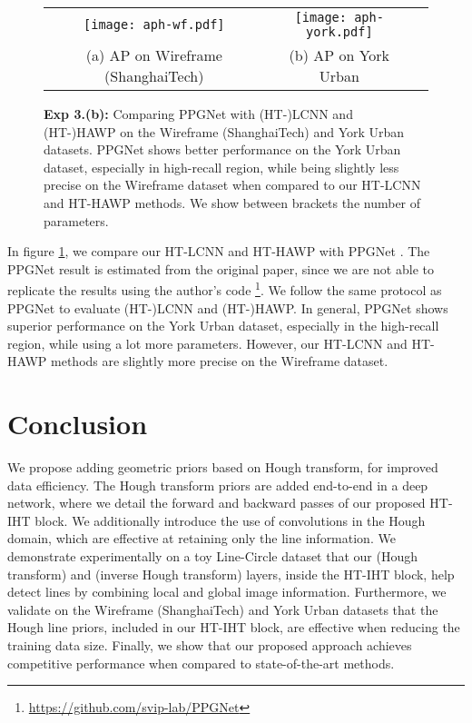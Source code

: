 \documentclass[runningheads]{llncs}
\newcommand{\model}{HT-IHT block\xspace}
\begin{document}
\begin{figure}[t!]
    \centering
    \begin{tabular}{ccc}
        \texttt{[image: aph-wf.pdf]} &
        \texttt{[image: aph-york.pdf]} \\
        \scriptsize{(a) AP on Wireframe (ShanghaiTech)} & 
        \scriptsize{(b) AP on York Urban}\\
    \end{tabular}
    \caption{
    \textbf{Exp 3.(b):} Comparing PPGNet\cite{zhang2019ppgnet} with (HT-)LCNN and (HT-)HAWP on the Wireframe (ShanghaiTech) and York Urban datasets. 
    PPGNet shows better performance on the York Urban dataset, especially in high-recall region, while
    being slightly less precise on the Wireframe dataset when compared to our HT-LCNN and HT-HAWP methods. 
    We show between brackets the number of parameters.}
    \label{fig:exp3_ppg}
\end{figure}

In figure \ref{fig:exp3_ppg}, we compare our HT-LCNN and HT-HAWP with PPGNet \cite{zhang2019ppgnet}. 
The PPGNet result is estimated from the original paper, since we are not able to replicate the results using the author\rq s code \footnote{\url{https://github.com/svip-lab/PPGNet}}. 
We follow the same protocol as PPGNet to evaluate (HT-)LCNN and (HT-)HAWP. 
In general, PPGNet shows superior performance on the York Urban dataset, especially in the high-recall region, while using a lot more parameters.
However, our HT-LCNN and HT-HAWP methods are slightly more precise on the Wireframe dataset.
 \section{Conclusion}
We propose adding geometric priors based on Hough transform, for improved data efficiency.
The Hough transform priors are added end-to-end in a deep network, where we 
detail the forward and backward passes of our proposed \model.
We additionally introduce the use of convolutions in the Hough domain, which are effective at retaining only the line information. 
We demonstrate experimentally on a toy Line-Circle dataset that our  (Hough transform) and  (inverse Hough transform) layers, inside the \model, help detect lines by combining local and global image information.
Furthermore, we validate on the Wireframe (ShanghaiTech) and York Urban datasets that the Hough line priors, included in our \model, are effective when reducing the training data size. 
Finally, we show that our proposed approach achieves competitive performance when compared to state-of-the-art methods.
 {
    \small
    
    {}
}
\end{document}

